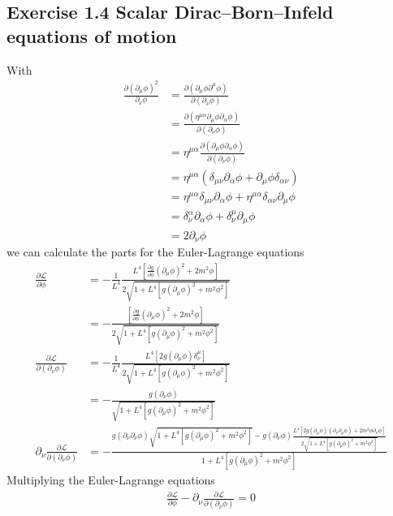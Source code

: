 \documentclass[10pt,a4paper]{book}
\theoremstyle{definition}
\begin{document}
\subsection{Exercise 1.4 Scalar Dirac–Born–Infeld equations of motion}
With
\begin{align}
\frac{\partial(\partial_\mu\phi)^2}{\partial_\nu\phi}
&=\frac{\partial(\partial_\mu\phi\partial^\mu\phi)}{\partial(\partial_\nu\phi)}\\
&=\frac{\partial(\eta^{\mu\alpha}\partial_\mu\phi\partial_\alpha\phi)}{\partial(\partial_\nu\phi)}\\
&=\eta^{\mu\alpha}\frac{\partial(\partial_\mu\phi\partial_\alpha\phi)}{\partial(\partial_\nu\phi)}\\
&=\eta^{\mu\alpha}(\delta_{\mu\nu}\partial_\alpha\phi+\partial_\mu\phi\delta_{\alpha\nu})\\
&=\eta^{\mu\alpha}\delta_{\mu\nu}\partial_\alpha\phi+\eta^{\mu\alpha}\delta_{\alpha\nu}\partial_\mu\phi\\
&=\delta_\nu^\alpha\partial_\alpha\phi+\delta_\nu^\mu\partial_\mu\phi\\
&=2\partial_\nu\phi
\end{align}
we can calculate the parts for the Euler-Lagrange equations
\begin{align}
\frac{\partial\mathcal{L}}{\partial\phi}
&=-\frac{1}{L^4}\frac{L^4\left[\frac{\partial g}{\partial\phi}(\partial_\mu\phi)^2+2m^2\phi\right]}{2\sqrt{1+L^4[g(\partial_\mu\phi)^2+m^2\phi^2]}}\\
&=-\frac{\left[\frac{\partial g}{\partial\phi}(\partial_\mu\phi)^2+2m^2\phi\right]}{2\sqrt{1+L^4[g(\partial_\mu\phi)^2+m^2\phi^2]}}\\
%
\frac{\partial\mathcal{L}}{\partial(\partial_\nu\phi)}
&=-\frac{1}{L^4}\frac{L^4\left[2g(\partial_\mu\phi)\delta^\mu_\nu\right]}{2\sqrt{1+L^4[g(\partial_\mu\phi)^2+m^2\phi^2]}}\\
&=-\frac{g(\partial_\nu\phi)}{\sqrt{1+L^4[g(\partial_\mu\phi)^2+m^2\phi^2]}}\\
%
\partial_\nu\frac{\partial\mathcal{L}}{\partial(\partial_\nu\phi)}&=-\frac{g(\partial_\nu\partial_\nu\phi)\sqrt{1+L^4[g(\partial_\mu\phi)^2+m^2\phi^2]}-g(\partial_\nu\phi)\frac{L^4[2g(\partial_\mu\phi)(\partial_\nu\partial_\mu\phi)+2m^2\phi\partial_\nu\phi]}{2\sqrt{1+L^4[g(\partial_\mu\phi)^2+m^2\phi^2]}}}{1+L^4[g(\partial_\mu\phi)^2+m^2\phi^2]}
\end{align}
Multiplying the Euler-Lagrange equations 
\begin{align}
\frac{\partial\mathcal{L}}{\partial\phi}-\partial_\nu\frac{\partial\mathcal{L}}{\partial(\partial_\nu\phi)}=0
\end{align}
\end{document}
